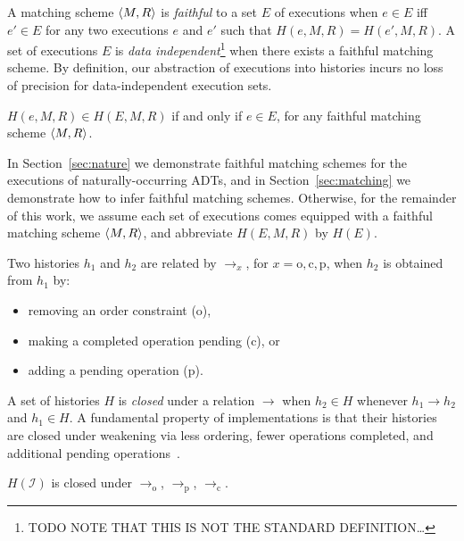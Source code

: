 A matching scheme ${\left\langle{M,R}\right\rangle}$ is \emph{faithful} to a set $E$ of executions
when $e \in E$ if{f} $e' \in E$ for any two executions $e$ and $e'$ such that
$H(e,M,R) = H(e',M,R)$. A set of executions $E$ is \emph{data
independent}\footnote{TODO NOTE THAT THIS IS NOT THE STANDARD DEFINITION…} when
there exists a faithful matching scheme. By definition, our abstraction of
executions into histories incurs no loss of precision for data-independent
execution sets.

\begin{lemma}

  $H(e,M,R) \in H(E,M,R)$ if and only if $e \in E$, for any faithful matching
  scheme ${\left\langle{M,R}\right\rangle}$.

\end{lemma}

In Section~\ref{sec:nature} we demonstrate faithful matching schemes for the
executions of naturally-occurring ADTs, and in Section~\ref{sec:matching} we
demonstrate how to infer faithful matching schemes. Otherwise, for the
remainder of this work, we assume each set of executions comes equipped with a
faithful matching scheme ${\left\langle{M,R}\right\rangle}$, and abbreviate $H(E,M,R)$ by $H(E)$.

Two histories $h_1$ and $h_2$ are related by $\to_x$, for $x = \mathrm{o},
\mathrm{c}, \mathrm{p}$, when $h_2$ is obtained from $h_1$ by:
\begin{itemize}

  \item removing an order constraint (o),

  \item making a completed operation pending (c), or

  \item adding a pending operation (p).

\end{itemize}
A set of histories $H$ is \emph{closed} under a relation $\to$ when $h_2 \in H$
whenever $h_1 \to h_2$ and $h_1 \in H$. A fundamental property of
implementations is that their histories are closed under weakening via less
ordering, fewer operations completed, and additional pending
operations~\cite{conf/popl/BouajjaniEEH15}.

\begin{lemma}

  $H(\mathcal{I})$ is closed under $\to_\mathrm{o}$, $\to_\mathrm{p}$, 
  $\to_\mathrm{c}$.

\end{lemma}
